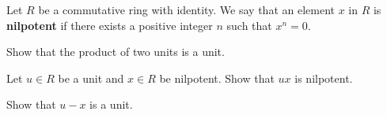\begin{problem}
    Let $R$ be a commutative ring with identity. We say that an element $x$ in $R$ is \textbf{nilpotent} if there exists a positive integer $n$ such that $x^n = 0$.
    \begin{partquestions}{\roman*}
        \item Show that the product of two units is a unit.
        \item Let $u \in R$ be a unit and $x \in R$ be nilpotent. Show that $ux$ is nilpotent.
        \item Show that $u - x$ is a unit.
    \end{partquestions}
\end{problem}
